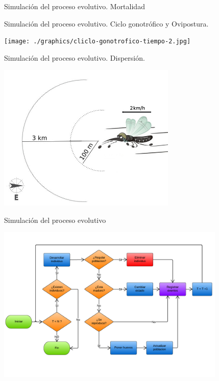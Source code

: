 \begin{frame}[c]{Simulación del proceso evolutivo. Mortalidad}

\end{frame}


\begin{frame}[c]{Simulación del proceso evolutivo. Ciclo gonotrófico y Ovipostura.}
\begin{center}
    \texttt{[image: ./graphics/cliclo-gonotrofico-tiempo-2.jpg]}
\end{center}
\end{frame}

\begin{frame}[c]{Simulación del proceso evolutivo. Dispersión.}
\begin{center}
  \includegraphics[width=8.5cm]{./graphics/dispersion.jpg}
\end{center}
\end{frame}


\begin{frame}[c]{Simulación del proceso evolutivo}
\begin{center}
  \includegraphics[height=7.5cm]{./graphics/algoritmo-propuesto.png}
\end{center}
\end{frame}

